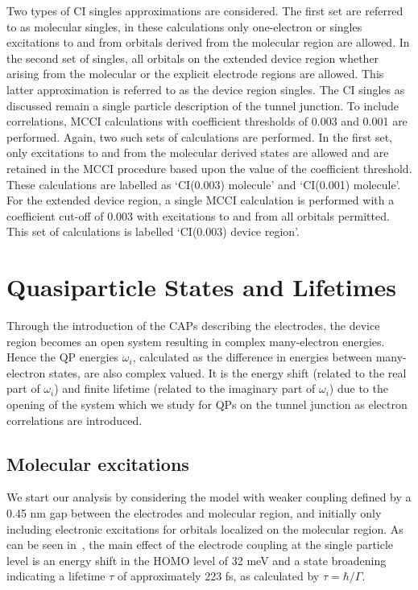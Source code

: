 Two types of CI singles approximations are considered. The first set are
referred to as molecular singles, in these calculations only one-electron
or singles excitations to and from orbitals derived from the molecular
region are allowed. In the second set of singles, all orbitals on the
extended device region whether arising from the molecular or the explicit
electrode regions are allowed. This latter approximation is referred to
as the device region singles. The CI singles as discussed remain a single
particle description of the tunnel junction. To include correlations,
MCCI calculations with coefficient thresholds of 0.003 and 0.001 are
performed. Again, two such sets of calculations are performed. In the
first set, only excitations to and from the molecular derived states are
allowed and are retained in the MCCI procedure based upon the value of
the coefficient threshold. These calculations are labelled as `CI(0.003)
molecule' and `CI(0.001) molecule'. For the extended device region, a
single MCCI calculation is performed with a coefficient cut-off of 0.003
with excitations to and from all orbitals permitted. This set of calculations
is labelled `CI(0.003) device region'. 

\section{Quasiparticle States and Lifetimes}

Through the introduction of the \acp{CAP} describing the electrodes, the
device region becomes an open system resulting in complex many-electron
energies. Hence the \ac{QP} energies $\omega_i$, calculated  as the
difference in energies between many-electron states, are also complex
valued. It is the energy shift (related to the real part of $\omega_i$)
and finite lifetime (related to the imaginary part of $\omega_i$) due to
the opening of the system which we study for \acp{QP} on the
tunnel junction as electron correlations are introduced.

\subsection{Molecular excitations}
We start our analysis by considering the model with weaker coupling
defined by a 0.45 nm gap between the electrodes and molecular region,
and initially only including electronic excitations for orbitals localized
on the molecular region. As can be seen in~, the
main effect of the electrode coupling at the single particle level is an
energy shift in the HOMO level of 32 meV and a state broadening indicating
a lifetime $\tau$ of approximately 223 fs, as calculated by
$\tau = \hbar / \Gamma$.

